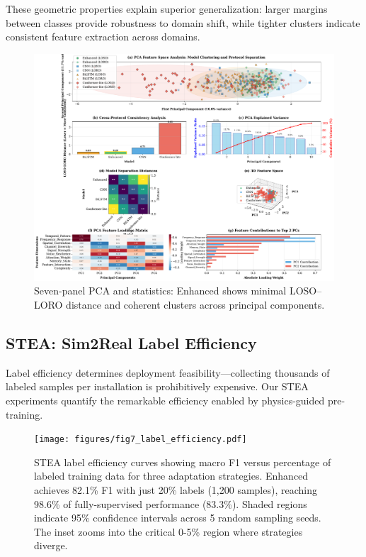 \documentclass[journal]{IEEEtran}
\begin{document}
These geometric properties explain superior generalization: larger margins between classes provide robustness to domain shift, while tighter clusters indicate consistent feature extraction across domains.

\begin{figure}[t]
\centering
\includegraphics[width=\columnwidth]{figures/fig6_pca_analysis.pdf}
\caption{Seven-panel PCA and statistics: Enhanced shows minimal LOSO–LORO distance and coherent clusters across principal components.}
\label{fig:pca}
\end{figure}

\subsection{STEA: Sim2Real Label Efficiency}
Label efficiency determines deployment feasibility—collecting thousands of labeled samples per installation is prohibitively expensive. Our STEA experiments quantify the remarkable efficiency enabled by physics-guided pre-training.

\begin{figure}[t]
\centering
\texttt{[image: figures/fig7\_label\_efficiency.pdf]}
\caption{STEA label efficiency curves showing macro F1 versus percentage of labeled training data for three adaptation strategies. Enhanced achieves 82.1\% F1 with just 20\% labels (1,200 samples), reaching 98.6\% of fully-supervised performance (83.3\%). Shaded regions indicate 95\% confidence intervals across 5 random sampling seeds. The inset zooms into the critical 0-5\% region where strategies diverge.}
\label{fig:stea}
\end{figure}
\end{document}
